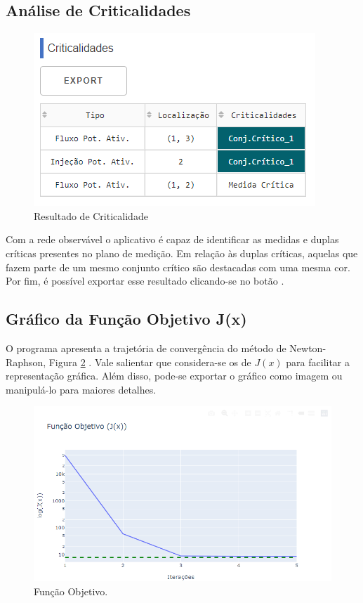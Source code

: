 \documentclass{article}
\begin{document}
\subsection{Análise de Criticalidades}
\begin{figure}
    \centering
    \includegraphics[scale = .65]{Imagens/Criticalidades_Ferrameta.PNG}
    \caption{Resultado de Criticalidade}
    \label{fig:my_label}
\end{figure}
Com a rede observável o aplicativo é capaz de identificar as medidas e duplas críticas presentes no plano de medição. Em relação às duplas críticas, aquelas que fazem parte de um mesmo conjunto crítico são destacadas com uma mesma cor. Por fim, é possível exportar esse resultado clicando-se no botão .

\subsection{Gráfico da Função Objetivo J(x)}
O programa apresenta a trajetória de convergência do método de Newton-Raphson, Figura \ref{fig:fobj} . Vale salientar que considera-se os  de $J(x)$ para facilitar a representação gráfica. Além disso, pode-se exportar o gráfico como imagem ou manipulá-lo para maiores detalhes.

\begin{figure}[H]
    \centering
    \includegraphics[scale=.65]{Imagens/Função_Objetivo_Ferramenta.PNG}
    \caption{Função Objetivo.}
    \label{fig:fobj}
\end{figure}
\end{document}
